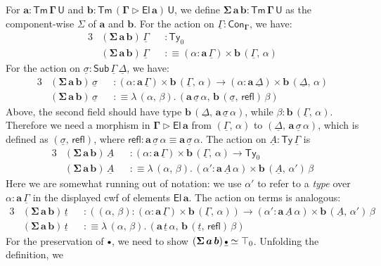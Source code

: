 \documentclass[12pt,a4paper,twoside,openany]{book}
\theoremstyle{remark}
\theoremstyle{definition}
\theoremstyle{theorem}
\newcommand{\bs}[1]{\boldsymbol{#1}}
\newcommand{\refl}{\mathsf{refl}}
\newcommand{\Con}{\mathsf{Con}}
\newcommand{\Sub}{\mathsf{Sub}}
\newcommand{\Tm}{\mathsf{Tm}}
\newcommand{\Ty}{\mathsf{Ty}}
\newcommand{\U}{\mathsf{U}}
\newcommand{\El}{\mathsf{El}}
\newcommand{\ext}{\triangleright}
\newcommand{\emptycon}{\scaleobj{.75}\bullet}
\newcommand{\bGamma}{\bs{\Gamma}}
\newcommand{\ba}{\bs{a}}
\newcommand{\bb}{\bs{b}}
\newcommand{\ul}[1]{\underline{#1}}
\newcommand{\ulGamma}{\ul{\Gamma}}
\newcommand{\ulDelta}{\ul{\Delta}}
\newcommand{\ulsigma}{\ul{\sigma}}
\newcommand{\ulemptycon}{\ul{\emptycon}}
\newcommand{\ult}{\ul{t}}
\newcommand{\ulA}{\ul{A}}
\newcommand{\defn}{:\equiv}
\begin{document}
For $\bs{a : \Tm\,\Gamma\,\U}$ and $\bs{b : \Tm\,(\Gamma\ext \El\,a)\,\U}$, we
define $\bs{\Sigma\,a\,b : \Tm\,\Gamma\,\U}$ as the component-wise $\Sigma$ of $\ba$
and $\bb$. For the action on $\ulGamma : \Con_{\bGamma}$, we have:
\begin{alignat*}{3}
  &(\bs{\Sigma\,a\,b})\,\ulGamma && : \Ty_0 \\
  &(\bs{\Sigma\,a\,b})\,\ulGamma &&\defn (\alpha : \ba\,\ulGamma) \times \bb\,(\ulGamma,\,\alpha)
\end{alignat*}
For the action on $\ulsigma : \Sub\,\ulGamma\,\ulDelta$, we have:
\begin{alignat*}{3}
  &(\bs{\Sigma\,a\,b})\,\ulsigma && : (\alpha : \ba\,\ulGamma) \times \bb\,(\ulGamma,\,\alpha)
    \to (\alpha : \ba\,\ulDelta) \times \bb\,(\ulDelta,\,\alpha)\\
  &(\bs{\Sigma\,a\,b})\,\ulsigma &&\defn \lambda\,(\alpha,\,\beta).\,(\ba\,\ulsigma\,\alpha,\,\bb\,(\ulsigma,\,\refl)\,\beta)
\end{alignat*}
Above, the second field should have type
$\bb\,(\ulDelta,\,\ba\,\ulsigma\,\alpha)$, while $\beta :
\bb\,(\ulGamma,\,\alpha)$. Therefore we need a morphism in $\bs{\Gamma \ext
  \El\,a}$ from $(\ulGamma,\,\alpha)$ to $(\ulDelta,\,\ba\,\ulsigma\,\alpha)$,
which is defined as $(\ulsigma,\,\refl)$, where $\refl : \ba\,\ulsigma\,\alpha
\equiv \ba\,\ulsigma\,\alpha$.
The action on $\ulA : \Ty\,\ulGamma$ is
\begin{alignat*}{3}
  &(\bs{\Sigma\,a\,b})\,\ulA &&: (\alpha : \ba\,\ulGamma) \times \bb\,(\ulGamma,\,\alpha)
    \to \Ty_0\\
  &(\bs{\Sigma\,a\,b})\,\ulA &&\defn \lambda\,(\alpha,\,\beta).\,(\alpha' : \ba\,\ulA\,\alpha) \times \bb\,(\ulA,\,\alpha')\,\beta
\end{alignat*}
Here we are somewhat running out of notation: we use $\alpha'$ to refer to a
\emph{type} over $\alpha : \ba\,\ulGamma$ in the displayed cwf of elements
$\bs{\El\,a}$. The action on terms is analogous:
\begin{alignat*}{3}
  &(\bs{\Sigma\,a\,b})\,\ult && : ((\alpha,\,\beta) : (\alpha : \ba\,\ulGamma) \times \bb\,(\ulGamma,\,\alpha))
    \to (\alpha' : \ba\,\ulA\,\alpha) \times \bb\,(\ulA,\,\alpha')\,\beta\\
  &(\bs{\Sigma\,a\,b})\,\ult &&\defn \lambda\,(\alpha,\,\beta).\,(\ba\,\ult\,\alpha,\,\bb\,(\ult,\,\refl)\,\beta)
\end{alignat*}
For the preservation of $\emptycon$, we need to show
$(\bs{\Sigma\,a\,b})\,\ulemptycon \simeq \top_0$. Unfolding the definition, we
\end{document}
